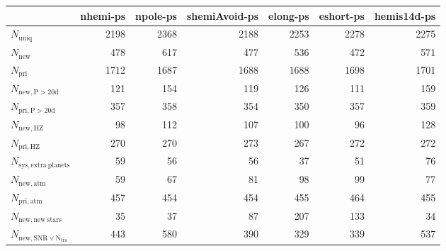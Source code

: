 \begin{tabular}{lrrrrrr}
\toprule
{} &  nhemi-ps &  npole-ps &  shemiAvoid-ps &  elong-ps &  eshort-ps &  hemis14d-ps \\
\midrule
$N_{\mathrm{uniq}}$                &      2198 &      2368 &           2188 &      2253 &       2278 &         2275 \\
$N_{\mathrm{new}}$                 &       478 &       617 &            477 &       536 &        472 &          571 \\
$N_{\mathrm{pri}}$                 &      1712 &      1687 &           1688 &      1688 &       1698 &         1701 \\
$N_{\mathrm{new,P>20d}}$           &       121 &       154 &            119 &       126 &        111 &          159 \\
$N_{\mathrm{pri,P>20d}}$           &       357 &       358 &            354 &       350 &        357 &          359 \\
$N_{\mathrm{new,HZ}}$              &        98 &       112 &            107 &       100 &         96 &          128 \\
$N_{\mathrm{pri,HZ}}$              &       270 &       270 &            273 &       267 &        272 &          272 \\
$N_{\mathrm{sys,extra\ planets}}$  &        59 &        56 &             56 &        37 &         51 &           76 \\
$N_{\mathrm{new,atm}}$             &        59 &        67 &             81 &        98 &         99 &           77 \\
$N_{\mathrm{pri,atm}}$             &       457 &       454 &            454 &       455 &        464 &          455 \\
$N_{\mathrm{new,new\ stars}}$      &        35 &        37 &             87 &       207 &        133 &           34 \\
$N_{\mathrm{new,SNR\lor N_{tra}}}$ &       443 &       580 &            390 &       329 &        339 &          537 \\
\bottomrule
\end{tabular}
